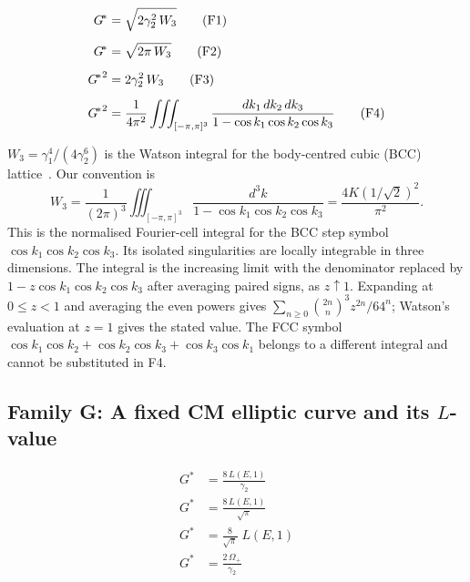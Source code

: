 \documentclass[12pt,reqno]{amsart}
\theoremstyle{definition}
\theoremstyle{remark}
\newcommand{\Gstar}{G^{\!*}}
\begin{document}
\begin{align}
  {\Gstar} &= \sqrt{2\gamma_{2}^{2}\,W_{3}}
    \tag{F1}\label{F1}\\[5pt]
  {\Gstar} &= \sqrt{2\pi\,W_{3}}
    \tag{F2}\label{F2}\\[5pt]
  {\Gstar}^{2} &= 2\gamma_{2}^{2}\,W_{3}
    \tag{F3}\label{F3}\\[5pt]
  {\Gstar}^{2} &= \frac{1}{4\pi^{2}}
    \iiint_{[-\pi,\pi]^{3}}
    \frac{dk_{1}\,dk_{2}\,dk_{3}}{%
    1-\cos k_{1}\cos k_{2}\cos k_{3}}
    \tag{F4}\label{F4}
\end{align}

\noindent
$W_{3}=\gamma_{1}^{4}/(4\gamma_{2}^{6})$ is the Watson integral for
the body-centred cubic (BCC) lattice~\cite{Watson}.
Our convention is
\[
 W_3=\frac{1}{(2\pi)^3}\iiint_{[-\pi,\pi]^3}
 \frac{d^3k}{1-\cos k_1\cos k_2\cos k_3}
 =\frac{4K(1/\sqrt2)^2}{\pi^2}.
\]
This is the normalised Fourier-cell integral for the BCC step symbol
$\cos k_1\cos k_2\cos k_3$. Its isolated singularities are locally
integrable in three dimensions. The integral is the increasing limit
with the denominator replaced by $1-z\cos k_1\cos k_2\cos k_3$
after averaging paired signs, as $z\uparrow1$.
Expanding at $0\leq z<1$ and averaging the even powers gives
$\sum_{n\geq0}\binom{2n}{n}^3z^{2n}/64^n$; Watson's evaluation at
$z=1$ gives the stated value. The FCC symbol
$\cos k_1\cos k_2+\cos k_2\cos k_3+\cos k_3\cos k_1$
belongs to a different integral and cannot be substituted in F4.

\subsection{Family G: A fixed CM elliptic curve and its \texorpdfstring{$L$}{L}-value}\label{sec:G}

\begin{align}
  {\Gstar} &= \frac{8\,L(E,1)}{\gamma_{2}}
    \tag{G1}\label{G1}\\[5pt]
  {\Gstar} &= \frac{8\,L(E,1)}{\sqrt{\pi}}
    \tag{G2}\label{G2}\\[5pt]
  {\Gstar} &= \frac{8}{\sqrt\pi}\;L(E,1)
    \tag{G3}\label{G3}\\[5pt]
  {\Gstar} &= \frac{2\,\Omega_{+}}{\gamma_{2}}
    \tag{G4}\label{G4}
\end{align}
\end{document}
